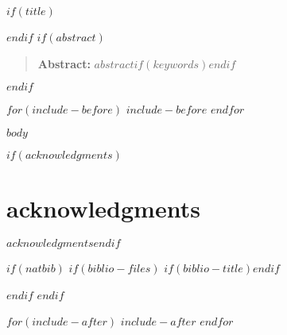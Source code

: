 \documentclass[11pt,oneside]{article}
\affil{$for(author)$$author.email$$sep$, $endfor$}
\renewcommand{\refname}{\bfseries{References}}
\begin{document}
$if(title)$\maketitle$endif$ %
$if(abstract)$\begin{quotation}\noindent\textbf{Abstract:} $abstract$$if(keywords)$$endif$\end{quotation}$endif$ %


$for(include-before)$
$include-before$
$endfor$

$body$

$if(acknowledgments)$\section*{acknowledgments}$acknowledgments$\cleardoublepage$endif$


$if(natbib)$
$if(biblio-files)$
$if(biblio-title)$\renewcommand\refname{$biblio-title$}$endif$

$endif$
$endif$

$for(include-after)$
$include-after$
$endfor$

\end{document}
